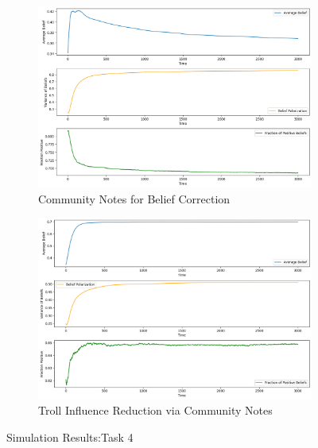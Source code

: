 \documentclass[a4paper,11pt]{scrartcl}
\begin{document}
\begin{figure}[!h]
    \begin{subfigure}[b]{0.45\textwidth}
        \centering
        \includegraphics[width=\textwidth]{./images/task4_4.png}
        \caption{Community Notes for Belief Correction}
        \label{fig:task4_4}
    \end{subfigure}
    \hfill
    \begin{subfigure}[b]{0.45\textwidth}
        \centering
        \includegraphics[width=\textwidth]{./images/task4_5.png}
        \caption{Troll Influence Reduction via Community Notes}
        \label{fig:task4_5}
    \end{subfigure}

    \caption{Simulation Results:Task 4}
    \label{fig:task4_Results}
\end{figure}
\end{document}
